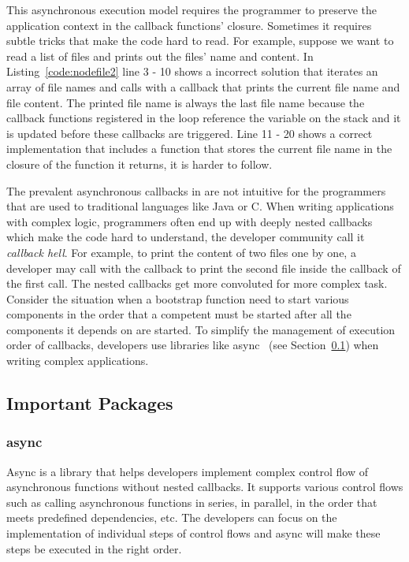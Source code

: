This asynchronous execution model requires the programmer to preserve the
application context in the callback functions' closure.  Sometimes it requires
subtle tricks that make the code hard to read. For example, suppose we want to
read a list of files and prints out the files' name and content. In
Listing~\ref{code:nodefile2}  line 3 - 10 shows a incorrect solution that
iterates an array of file names  and calls  with a callback
that prints the current file name and file content. The printed file name is
always the last file name because the callback functions registered in the
loop reference the  variable on the stack and it is updated
before these callbacks are triggered. Line 11 - 20 shows a correct
implementation  that includes a function that  stores the current file name in
the closure of the function it returns, it is harder to follow.



The prevalent asynchronous callbacks in \js are not intuitive for the
programmers that are used to traditional languages like Java or C. When
writing applications with complex logic, programmers often end up with deeply
nested callbacks which make the code hard to understand, the developer
community call it \emph{callback hell}. For example, to print the content of
two files one by one, a developer may call  with the callback
to print the second file  inside the callback of the first 
call. The nested callbacks get more convoluted for more complex task. Consider
the situation when a bootstrap function need to start various components in
the order that a competent must be started after all the components it depends
on are started.  To simplify the management of execution order of callbacks,
developers use libraries like async~\cite{async} (see
Section~\ref{sec:nodepackage}) when writing complex applications.




\subsection{Important \nodejs Packages}
\label{sec:nodepackage}

\subsubsection{async}
Async is a library that helps developers implement complex control flow of asynchronous 
functions without nested callbacks. 
It supports various control flows such as calling asynchronous functions in
series, in parallel, in the order that meets predefined dependencies, etc.
The developers can focus on the implementation of individual steps
of control flows and async will make these steps be executed in the right order.



